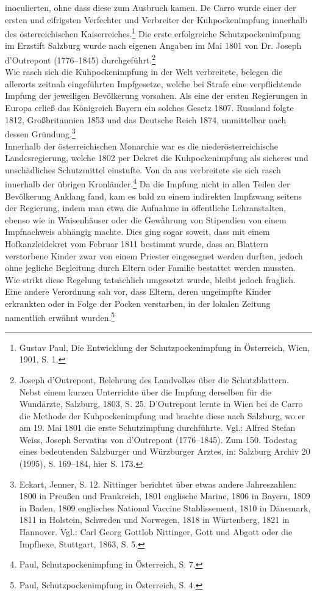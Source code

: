 \documentclass[
    a4paper,
    12pt,
    hyphens,
    chapterprefix=true,
    headheight=33pt,
    footheight=29pt,
    headings=optiontohead,
]{scrartcl}
\begin{document}
inoculierten, ohne dass diese zum Ausbruch kamen. De Carro wurde einer der ersten und eifrigsten Verfechter und Verbreiter der Kuhpockenimpfung innerhalb des österreichischen Kaiserreiches.\footnote{Gustav Paul, Die Entwicklung der Schutzpockenimpfung in Österreich, Wien, 1901, S. 1.} Die erste erfolgreiche Schutzpockenimfpung im Erzstift Salzburg wurde nach eigenen Angaben im Mai 1801 von Dr. Joseph d'Outrepont (1776--1845) durchgeführt.\footnote{Joseph d'Outrepont, Belehrung des Landvolkes über die Schutzblattern. Nebst einem kurzen Unterrichte über die Impfung derselben für die Wundärzte, Salzburg, 1803, S. 25. D'Outrepont lernte in Wien bei de Carro die Methode der Kuhpockenimpfung und brachte diese nach Salzburg, wo er am 19. Mai 1801 die erste Schutzimpfung durchführte. Vgl.: Alfred Stefan Weiss, Joseph Servatius von d'Outrepont (1776--1845). Zum 150. Todestag eines bedeutenden Salzburger und Würzburger Arztes, in: Salzburg Archiv 20 (1995), S. 169--184, hier S. 173.}\\
Wie rasch sich die Kuhpockenimpfung in der Welt verbreitete, belegen die allerorts zeitnah eingeführten Impfgesetze, welche bei Strafe eine verpflichtende Impfung der jeweiligen Bevölkerung vorsahen. Als eine der ersten Regierungen in Europa erließ das Königreich Bayern ein solches Gesetz 1807. Russland folgte 1812, Großbritannien 1853 und das Deutsche Reich 1874, unmittelbar nach dessen Gründung.\footnote{Eckart, Jenner, S. 12. Nittinger berichtet über etwas andere Jahreszahlen: 1800 in Preußen und Frankreich, 1801 englische Marine, 1806 in Bayern, 1809 in Baden, 1809 englisches National Vaccine Stablissement, 1810 in Dänemark, 1811 in Holstein, Schweden und Norwegen, 1818 in Würtenberg, 1821 in Hannover. Vgl.: Carl Georg Gottlob Nittinger, Gott und Abgott oder die Impfhexe, Stuttgart, 1863, S. 5.}\\
Innerhalb der österreichischen Monarchie war es die niederösterreichische Landesregierung, welche 1802 per Dekret die Kuhpockenimpfung als sicheres und unschädliches Schutzmittel einstufte. Von da aus verbreitete sie sich rasch innerhalb der übrigen Kronländer.\footnote{Paul, Schutzpockenimpfung in Österreich, S. 7.} Da die Impfung nicht in allen Teilen der Bevölkerung Anklang fand, kam es bald zu einem indirekten Impfzwang seitens der Regierung, indem man etwa die Aufnahme in öffentliche Lehranstalten, ebenso wie in Waisenhäuser oder die Gewährung von Stipendien von einem Impfnachweis abhängig machte. Dies ging sogar soweit, dass mit einem Hofkanzleidekret vom Februar 1811 bestimmt wurde, dass an Blattern verstorbene Kinder zwar von einem Priester eingesegnet werden durften, jedoch ohne jegliche Begleitung durch Eltern oder Familie bestattet werden mussten. Wie strikt diese Regelung tatsächlich umgesetzt wurde, bleibt jedoch fraglich. Eine andere Verordnung sah vor, dass Eltern, deren ungeimpfte Kinder erkrankten oder in Folge der Pocken verstarben, in der lokalen Zeitung namentlich erwähnt wurden.\footnote{Paul, Schutzpockenimpfung in Österreich, S. 4.}\\
\end{document}
